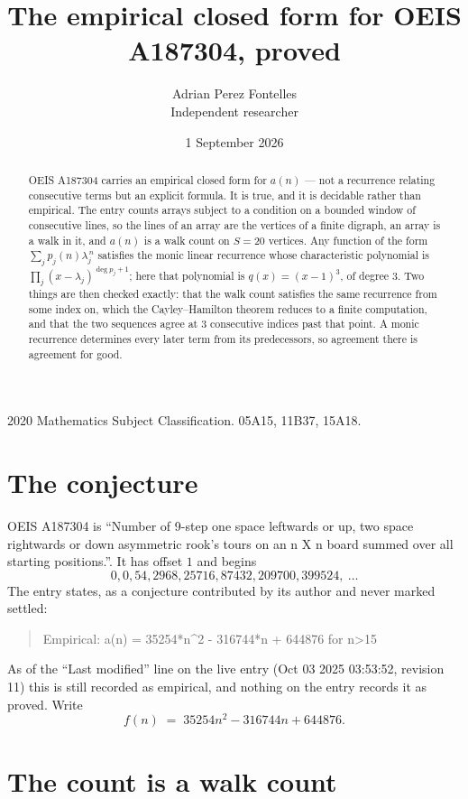 \documentclass[11pt,a4paper]{article}
\title{The empirical closed form for OEIS A187304, proved}
\author{Adrian Perez Fontelles\\ \small Independent researcher}
\date{1 September 2026}
\theoremstyle{plain}
\theoremstyle{definition}
\begin{document}
\maketitle

\begin{abstract}
OEIS A187304 carries an empirical closed form for $a(n)$ --- not a recurrence relating
consecutive terms but an explicit formula. It is true, and it is decidable rather than
empirical. The entry counts arrays subject to a condition on a bounded window of consecutive lines, so the lines of an array are the
vertices of a finite digraph, an array is a walk in it, and $a(n)$ is a walk count on
$S=20$ vertices. Any function of the form $\sum_j p_j(n)\lambda_j^{\,n}$ satisfies the
monic linear recurrence whose characteristic polynomial is
$\prod_j(x-\lambda_j)^{\deg p_j+1}$; here that polynomial is $q(x)=(x-1)^{3}$, of degree
$3$. Two things are then checked exactly: that the walk count satisfies the same
recurrence from some index on, which the Cayley--Hamilton theorem reduces to a finite
computation, and that the two sequences agree at $3$ consecutive indices past that
point. A monic recurrence determines every later term from its predecessors, so agreement
there is agreement for good.
\end{abstract}

\noindent\small 2020 Mathematics Subject Classification. 05A15, 11B37, 15A18.\normalsize

\section{The conjecture}

OEIS A187304 is ``Number of 9-step one space leftwards or up, two space rightwards or down asymmetric rook's tours on an n X n board summed over all starting positions.''. It has offset $1$ and begins
\[
0, 0, 54, 2968, 25716, 87432, 209700, 399524,\ \dots
\]
The entry states, as a conjecture contributed by its author and never marked settled:
\begin{quote}
Empirical: a(n) = 35254*n\^{}2 - 316744*n + 644876 for n>15
\end{quote}
As of the ``Last modified'' line on the live entry (Oct 03 2025 03:53:52, revision 11) this is still
recorded as empirical, and nothing on the entry records it as proved. Write
\[
f(n)\;=\;35254 n^{2} - 316744 n + 644876.
\]

\section{The count is a walk count}
\end{document}
